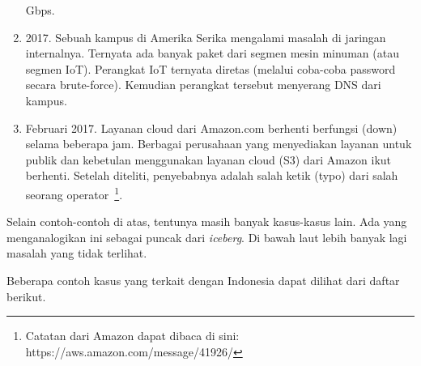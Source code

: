 \begin{enumerate}
   Gbps.
\item 2017.
   Sebuah kampus di Amerika Serika mengalami masalah di jaringan internalnya.
      Ternyata ada banyak paket dari segmen mesin minuman (atau segmen IoT).
      Perangkat IoT ternyata diretas (melalui coba-coba password secara
      brute-force). Kemudian perangkat tersebut menyerang DNS dari kampus.
\item Februari 2017. 
   Layanan cloud dari Amazon.com berhenti berfungsi (down) selama beberapa jam.
      Berbagai perusahaan yang menyediakan layanan untuk publik dan kebetulan
      menggunakan layanan cloud (S3) dari Amazon ikut berhenti. Setelah
      diteliti, penyebabnya adalah salah ketik (typo) dari salah seorang
      operator~\footnote{Catatan dari Amazon dapat dibaca di sini: https://aws.amazon.com/message/41926/}.
\end{enumerate}

Selain contoh-contoh di atas, tentunya masih banyak kasus-kasus lain.
Ada yang menganalogikan ini sebagai puncak dari {\em iceberg}.
Di bawah laut lebih banyak lagi masalah yang tidak terlihat.

Beberapa contoh kasus yang terkait dengan Indonesia dapat
dilihat dari daftar berikut.

